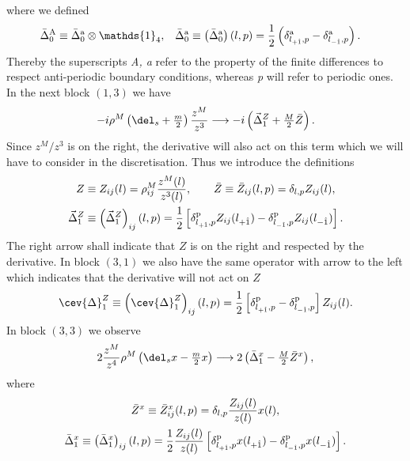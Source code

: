 %
%
where we defined
%
%
\begin{align}
\bar{\Delta}^{\rm A}_{0} &\equiv \bar{\Delta}^{\rm a}_{0} \otimes \mathds{1}_{4}, &
\bar{\Delta}^{\rm a}_{0} &\equiv \left(\bar{\Delta}^{\rm a}_{0}\right)(l,p) = \frac{1}{2}\left( \delta_{l_{+\hat{1}},p}^{\rm a}-\delta_{l_{-\hat{1}},p}^{\rm a}\right).
\end{align}
%
%
Thereby the superscripts \textit{A, a} refer to the property of the finite differences to respect anti-periodic boundary conditions, whereas \textit{p} will refer to periodic ones. In the next block $(1,3)$ we have
%
%
\begin{equation}
-i \rho^{M}\left(\del_{s} +\tfrac{m}{2}\right) \frac{z^{M}}{z^{3}} \longrightarrow -i \left( \vec{\Delta}_{1}^{Z} +\tfrac{M}{2} \bar{Z}\right).
\end{equation}
%
%
Since $z^{M}/z^{3}$ is on the right, the derivative will also act on this term which we will have to consider in the discretisation. Thus we introduce the definitions
%
%
\begin{gather}
Z \equiv Z_{ij}(l) = \rho_{ij}^{M} \frac{z^{M}(l)}{z^{3}(l)}, \qquad \bar{Z} \equiv \bar{Z}_{ij}(l,p) = \delta_{l,p} Z_{ij}(l), \\
\vec{\Delta}_{1}^{Z} \equiv \left(\vec{\Delta}_{1}^{Z}\right)_{ij}(l,p) = \frac{1}{2} \left[ \delta_{l_{+\hat{1}},p}^{\rm p}Z_{ij}(l_{+\hat{1}})-\delta_{l_{-\hat{1}},p}^{\rm p} Z_{ij}(l_{-\hat{1}})\right].
\end{gather}
%
%
The right arrow shall indicate that $Z$ is on the right and respected by the derivative. In block $(3,1)$ we also have the same operator with arrow to the left which indicates that the derivative will not act on $Z$
%
%
\begin{equation}
\cev{\Delta}_{1}^{Z} \equiv \left(\cev{\Delta}_{1}^{Z}\right)_{ij}(l,p) = \frac{1}{2} \left[ \delta_{l_{+\hat{1}},p}^{\rm p}-\delta_{l_{-\hat{1}},p}^{\rm p}\right] Z_{ij}(l) .
\end{equation}
%
%
In block $(3,3)$ we observe
%
%
\begin{equation}
2\frac{z^{M}}{z^{4}}\rho^{M}\left(\del_{s}x-\tfrac{m}{2}x\right) \longrightarrow  2\left( \bar{\Delta}_{1}^{x}-\tfrac{M}{2}\bar{Z}^{x} \right),
\end{equation}
%
%
where
%
%
\begin{gather}
\bar{Z}^{x} \equiv \bar{Z}^{x}_{ij}(l,p) = \delta_{l,p}\frac{Z_{ij}(l)}{z(l)}x(l), \\
\bar{\Delta}_{1}^{x} \equiv \left(\bar{\Delta}_{1}^{x}\right)_{ij}(l,p) = \frac{1}{2} \frac{Z_{ij}(l)}{z(l)} \left[ \delta_{l_{+\hat{1}},p}^{\rm p}x(l_{+\hat{1}})-\delta_{l_{-\hat{1}},p}^{\rm p} x(l_{-\hat{1}})\right].
\end{gather}
